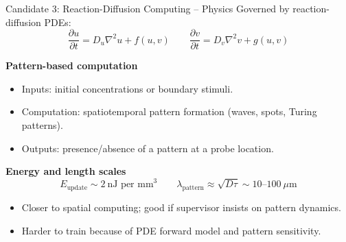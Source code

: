 \documentclass[aspectratio=169,11pt]{beamer}
\begin{document}
\begin{frame}{Candidate 3: Reaction-Diffusion Computing -- Physics}
  \small
  Governed by reaction-diffusion PDEs:
  \[
    \frac{\partial u}{\partial t} = D_u \nabla^2 u + f(u,v)
    \qquad
    \frac{\partial v}{\partial t} = D_v \nabla^2 v + g(u,v)
  \]

  \vspace{0.1cm}
  \textbf{Pattern-based computation}
  \begin{itemize}
    \item Inputs: initial concentrations or boundary stimuli.
    \item Computation: spatiotemporal pattern formation (waves, spots, Turing patterns).
    \item Outputs: presence/absence of a pattern at a probe location.
  \end{itemize}

  \vspace{0.1cm}
  \textbf{Energy and length scales}
  \[
    E_{\text{update}} \sim 2\ \text{nJ per mm}^3
    \qquad
    \lambda_{\text{pattern}} \approx \sqrt{D\tau} \sim 10\text{--}100\ \mu\text{m}
  \]
  \begin{itemize}
    \item Closer to spatial computing; good if supervisor insists on pattern dynamics.
    \item Harder to train because of PDE forward model and pattern sensitivity.
  \end{itemize}
\end{frame}
\end{document}
